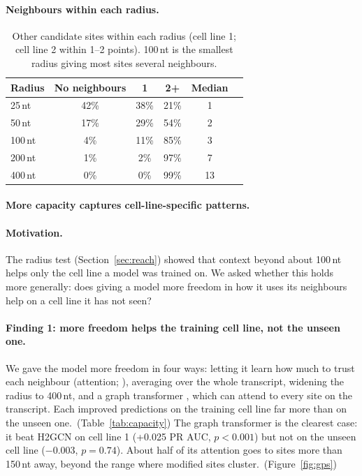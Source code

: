 \documentclass[11pt,a4paper]{article}
\begin{document}
\paragraph{Neighbours within each radius.}
\begin{table}[H]
    \centering\small
    \begin{tabular}{lccccc}
        \toprule
        \textbf{Radius} & \textbf{No neighbours} & \textbf{1} & \textbf{2+} & \textbf{Median} \\
        \midrule
        25\,nt & 42\% & 38\% & 21\% & 1 \\
        50\,nt & 17\% & 29\% & 54\% & 2 \\
        100\,nt & 4\% & 11\% & 85\% & 3 \\
        200\,nt & 1\% & 2\% & 97\% & 7 \\
        400\,nt & 0\% & 0\% & 99\% & 13 \\
        \bottomrule
    \end{tabular}
    \caption{Other candidate sites within each radius (cell line 1; cell line
    2 within 1--2 points). 100\,nt is the smallest radius giving most sites
    several neighbours.}
    \label{tab:nbrradius}
\end{table}

\label{app:capacity-findings}
\paragraph{More capacity captures cell-line-specific patterns.}


\paragraph{Motivation.}
The radius test (Section~\ref{sec:reach}) showed that context beyond about 100\,nt helps only the cell line a model was trained on. We asked whether this holds more generally: does giving a model more freedom in how it uses its neighbours help on a cell line it has not seen?

\paragraph{Finding 1: more freedom helps the training cell line, not the unseen one.}
We gave the model more freedom in four ways: letting it learn how much to trust each neighbour (attention; \citealp{velickovic2018}), averaging over the whole transcript, widening the radius to 400\,nt, and a graph transformer \citep{rampasek2022}, which can attend to every site on the transcript. Each improved predictions on the training cell line far more than on the unseen one.~(Table~\ref{tab:capacity}) The graph transformer is the clearest case: it beat H2GCN on cell line 1 (+0.025 PR AUC, $p<0.001$) but not on the unseen cell line ($-0.003$, $p=0.74$). About half of its attention goes to sites more than 150\,nt away, beyond the range where modified sites cluster.~(Figure~\ref{fig:gps})
\end{document}
